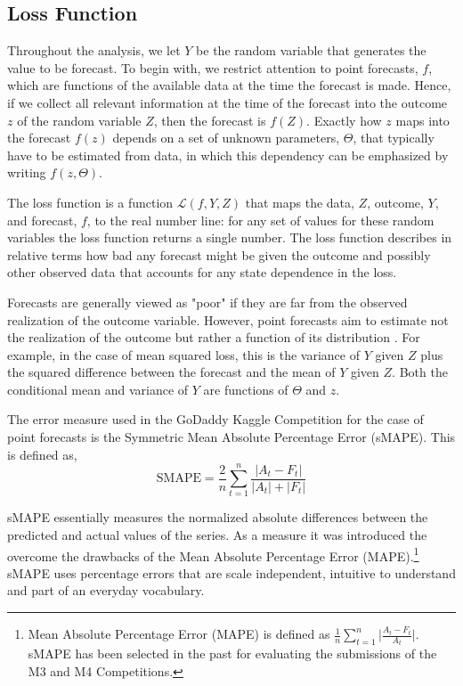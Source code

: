 \documentclass[
a4paper, %
12pt, %
]{CascadeAnalyticsWPS}
\begin{document}
\subsection{Loss Function}

Throughout the analysis, we let $Y$ be the random variable that generates the value to
be forecast. To begin with, we restrict attention to point forecasts, $f$, which are functions
of the available data at the time the forecast is made. Hence, if we collect all relevant
information at the time of the forecast into the outcome $z$ of the random variable $Z$, then the forecast is $f(Z)$. Exactly how $z$ maps into the forecast $f(z)$ depends on a set of unknown parameters, $\Theta$, that typically have to be estimated from data, in which this dependency can be emphasized by writing $f(z, \Theta)$.

The loss function is a function $\mathcal{L}(f, Y, Z)$ that maps the data, $Z$, outcome, $Y$, and forecast, $f$, to the real number line: for any set of values for these random variables the loss function returns a single number. The loss function describes in relative terms how bad any forecast might be given the outcome and possibly other observed data that accounts for any state dependence in the loss.

Forecasts are generally viewed as "poor" if they are far from the observed realization of the outcome variable. However, point forecasts aim to estimate not the realization of the outcome but rather a function of its distribution \citep{elliot_2008, barrow2016}. For example, in the case of mean squared loss, this is the variance of $Y$ given $Z$ plus the squared difference between the forecast and the mean of $Y$ given $Z$. Both the conditional mean and variance of $Y$ are functions of $\Theta$ and $z$.

The error measure used in the GoDaddy Kaggle Competition for
the case of point forecasts is the Symmetric Mean Absolute Percentage Error (sMAPE). This is defined as,
\begin{equation}
\text{SMAPE} =\frac{2}{n}\sum\limits_{t=1}^{n}\frac{\big|A_{t} - F_{t}\big|}{\lvert{A_{t}}\rvert + \lvert{F_t}\rvert}
\end{equation}

sMAPE essentially measures the normalized absolute differences between the predicted and actual values of the series. As a measure it was introduced the overcome the drawbacks of the Mean Absolute Percentage Error (MAPE).\footnote{Mean Absolute Percentage Error (MAPE) is defined as $\frac{1}{n}\sum\limits_{t=1}^{n}\Bigg |\frac{A_{t} - F_{t}}{A_{t}} \Bigg |$. sMAPE has been selected in the past for evaluating the submissions of the M3 and M4 Competitions.}
sMAPE uses percentage errors that are scale independent, intuitive
to understand and part of an everyday vocabulary. 
\end{document}
